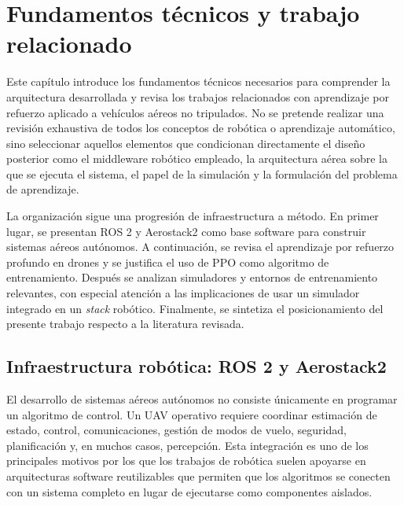 \chapter{Fundamentos técnicos y trabajo relacionado} \label{chp:state-of-the-art}

Este capítulo introduce los fundamentos técnicos necesarios para comprender la arquitectura desarrollada
y revisa los trabajos relacionados con aprendizaje por
refuerzo aplicado a vehículos aéreos no tripulados. No se pretende
realizar una revisión exhaustiva de todos los conceptos de robótica o aprendizaje
automático, sino seleccionar aquellos elementos que condicionan directamente el
diseño posterior como el middleware robótico empleado, la arquitectura aérea sobre la
que se ejecuta el sistema, el papel de la simulación y la formulación del
problema de aprendizaje.

La organización sigue una progresión de infraestructura a método. En primer
lugar, se presentan ROS 2 y Aerostack2 como base software para construir sistemas
aéreos autónomos. A continuación, se revisa el aprendizaje por refuerzo profundo
en drones y se justifica el uso de PPO como algoritmo de entrenamiento. Después
se analizan simuladores y entornos de entrenamiento relevantes, con especial
atención a las implicaciones de usar un simulador integrado en un \emph{stack}
robótico. Finalmente, se sintetiza el posicionamiento del presente trabajo
respecto a la literatura revisada.


\section{Infraestructura robótica: ROS 2 y Aerostack2}

El desarrollo de sistemas aéreos autónomos no consiste únicamente en programar
un algoritmo de control. Un UAV operativo requiere coordinar estimación de
estado, control, comunicaciones, gestión de modos de vuelo, seguridad,
planificación y, en muchos casos, percepción. Esta integración es uno de los
principales motivos por los que los trabajos de robótica suelen apoyarse en
arquitecturas software reutilizables que permiten que los algoritmos se conecten con
un sistema completo en lugar de ejecutarse como componentes aislados.


